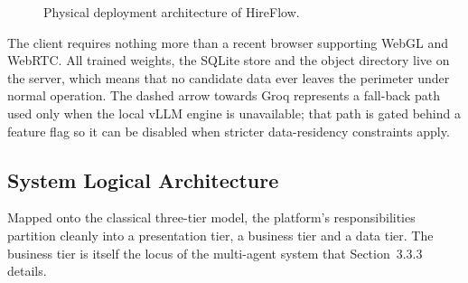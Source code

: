\begin{figure}[H]
{{%
    }}
    \caption{Physical deployment architecture of HireFlow.}
    \label{fig:physical-arch}
\end{figure}

The client requires nothing more than a recent browser supporting
WebGL and WebRTC. All trained weights, the SQLite store and the
object directory live on the server, which means that no candidate
data ever leaves the perimeter under normal operation. The dashed
arrow towards Groq represents a fall-back path used only when the
local vLLM engine is unavailable; that path is gated behind a
feature flag so it can be disabled when stricter data-residency
constraints apply.

\subsection{System Logical Architecture}

Mapped onto the classical three-tier model, the platform's
responsibilities partition cleanly into a presentation tier, a
business tier and a data tier. The business tier is itself the
locus of the multi-agent system that Section~3.3.3 details.

